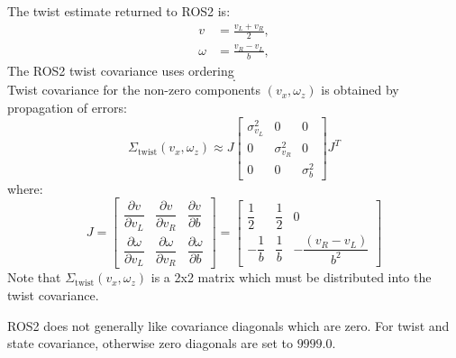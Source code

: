 \documentclass[11pt]{article}
\begin{document}
The twist estimate returned to ROS2 is:
\begin{align}
v &= \frac{v_L+v_R}{2}, \\
\omega &= \frac{v_R-v_L}{b},
\end{align}
The ROS2 twist covariance uses ordering
\begin{equation}
[v_x,\ v_y,\ v_z,\ \omega_x,\ \omega_y,\ \omega_z].
\end{equation}
Twist covariance for the non-zero components $(v_x,\omega_z)$ is obtained by propagation of errors:
\begin{equation}
\Sigma_{\mathrm{twist}} (v_x,\omega_z)
\approx
J
\begin{bmatrix}
\sigma_{v_L}^2 & 0 & 0 \\
0 & \sigma_{v_R}^2 & 0 \\
0 & 0 & \sigma_b^2
\end{bmatrix}
J^T
\end{equation}
where:
\begin{equation}
J =
\begin{bmatrix}
\dfrac{\partial v}{\partial v_L} &
\dfrac{\partial v}{\partial v_R} &
\dfrac{\partial v}{\partial b} \\[8pt]
\dfrac{\partial \omega}{\partial v_L} &
\dfrac{\partial \omega}{\partial v_R} &
\dfrac{\partial \omega}{\partial b}
\end{bmatrix}
=
\begin{bmatrix}
\dfrac{1}{2} & \dfrac{1}{2} & 0 \\[10pt]
-\dfrac{1}{b} & \dfrac{1}{b} &
-\dfrac{(v_R-v_L)}{b^2}
\end{bmatrix}
\end{equation}
Note that $\Sigma_{\mathrm{twist}} (v_x,\omega_z)$ is a 2x2 matrix which must be distributed into the twist covariance.

ROS2 does not generally like covariance diagonals which are zero. For twist and state covariance, otherwise zero diagonals are set to $9999.0$.
\end{document}
